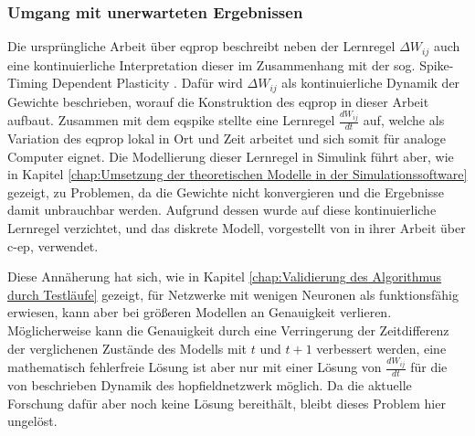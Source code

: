 \subsubsection{Umgang mit unerwarteten Ergebnissen}

Die ursprüngliche Arbeit über \gls{eqprop} beschreibt neben der Lernregel \(\Delta W_{ij}\) auch eine kontinuierliche Interpretation dieser im Zusammenhang mit der sog. Spike-Timing Dependent Plasticity \cite{Scellier2017}. Dafür wird \(\Delta W_{ij}\) als kontinuierliche Dynamik der Gewichte beschrieben, worauf die Konstruktion des \gls{eqprop} in dieser Arbeit aufbaut. Zusammen mit dem \gls{eqspike} stellte \citeauthor{Martin2020} eine Lernregel \(\frac{dW_{ij}}{dt}\) auf, welche als Variation des \gls{eqprop} lokal in Ort und Zeit arbeitet und sich somit für analoge Computer eignet. Die Modellierung dieser Lernregel in Simulink führt aber, wie in Kapitel \ref{chap:Umsetzung der theoretischen Modelle in der Simulationssoftware} gezeigt, zu Problemen, da die Gewichte nicht konvergieren und die Ergebnisse damit unbrauchbar werden. Aufgrund dessen wurde auf diese kontinuierliche Lernregel verzichtet, und das diskrete Modell, vorgestellt von \citeauthor{Ernoult2020} in ihrer Arbeit über \gls{c-ep}, verwendet.

Diese Annäherung hat sich, wie in Kapitel \ref{chap:Validierung des Algorithmus durch Testläufe} gezeigt, für Netzwerke mit wenigen Neuronen als funktionsfähig erwiesen, kann aber bei größeren Modellen an Genauigkeit verlieren. Möglicherweise kann die Genauigkeit durch eine Verringerung der Zeitdifferenz der verglichenen Zustände des Modells mit \(t\) und \(t+1\) verbessert werden, eine mathematisch fehlerfreie Lösung ist aber nur mit einer Lösung von \(\frac{dW_{ij}}{dt}\) für die von \citeauthor{Scellier2017} beschrieben Dynamik des \gls{hopfieldnetzwerk} möglich. Da die aktuelle Forschung dafür aber noch keine Lösung bereithält, bleibt dieses Problem hier ungelöst.
